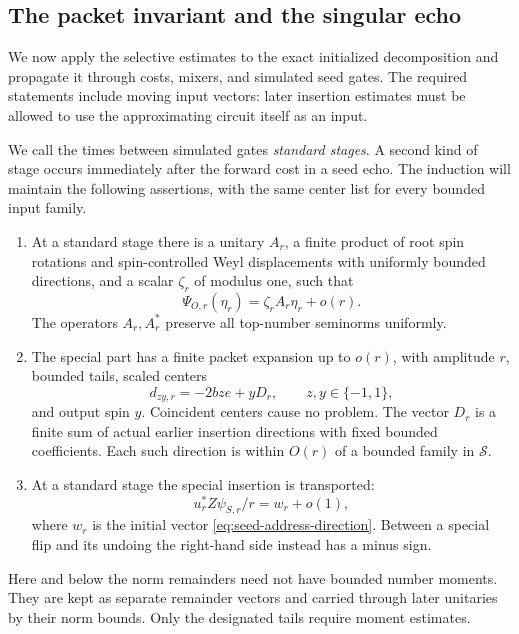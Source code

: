 \subsection{The packet invariant and the singular echo}

We now apply the selective estimates to the exact initialized
decomposition and propagate it through costs, mixers, and simulated
seed gates.  The required statements include
moving input vectors: later insertion estimates must be allowed to use
the approximating circuit itself as an input.

We call the times between simulated gates \emph{standard stages}.  A
second kind of stage occurs immediately after the forward cost in a
seed echo.  The induction will maintain the following assertions, with
the same center list for every bounded input family.
\begin{enumerate}
\item At a standard stage there is a unitary \(A_r\), a finite product
of root spin rotations and spin-controlled Weyl displacements with
uniformly bounded directions, and a scalar \(\zeta_r\) of modulus one,
such that
\begin{equation}
\label{eq:seed-low-ordinary}
 \Psi_{O,r}(\eta_r)=\zeta_r A_r\eta_r+o(r).
\end{equation}
The operators \(A_r,A_r^*\) preserve all top-number seminorms uniformly.
\item The special part has a finite packet expansion up to \(o(r)\),
with amplitude \(r\), bounded tails, scaled centers
\begin{equation}
\label{eq:seed-special-centers}
 d_{zy,r}=-2bz e+yD_r,\qquad z,y\in\{-1,1\},
\end{equation}
and output spin \(y\).  Coincident centers cause no problem.  The vector
\(D_r\) is a finite sum of actual earlier insertion directions with
fixed bounded coefficients.  Each such direction is within \(O(r)\)
of a bounded family in \(\mathcal S\).
\item At a standard stage the special insertion is transported:
\begin{equation}
\label{eq:seed-transport}
 u_r^*Z\psi_{S,r}/r=w_r+o(1),
\end{equation}
where \(w_r\) is the initial vector
\eqref{eq:seed-address-direction}.  Between a special flip and its
undoing the right-hand side instead has a minus sign.
\end{enumerate}
Here and below the norm remainders need not have bounded number moments.
They are kept as separate remainder vectors and carried through later
unitaries by their norm bounds.  Only the designated tails require
moment estimates.

